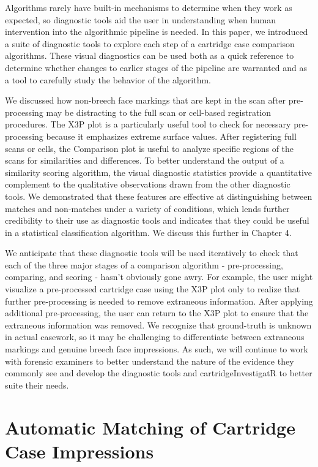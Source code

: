\documentclass[11pt,]{isuthesis}
\begin{document}
Algorithms rarely have built-in mechanisms to determine when they work as expected, so diagnostic tools aid the user in understanding when human intervention into the algorithmic pipeline is needed.
In this paper, we introduced a suite of diagnostic tools to explore each step of a cartridge case comparison algorithms.
These visual diagnostics can be used both as a quick reference to determine whether changes to earlier stages of the pipeline are warranted and as a tool to carefully study the behavior of the algorithm.

We discussed how non-breech face markings that are kept in the scan after pre-processing may be distracting to the full scan or cell-based registration procedures.
The X3P plot is a particularly useful tool to check for necessary pre-processing because it emphasizes extreme surface values.
After registering full scans or cells, the Comparison plot is useful to analyze specific regions of the scans for similarities and differences.
To better understand the output of a similarity scoring algorithm, the visual diagnostic statistics provide a quantitative complement to the qualitative observations drawn from the other diagnostic tools.
We demonstrated that these features are effective at distinguishing between matches and non-matches under a variety of conditions, which lends further credibility to their use as diagnostic tools and indicates that they could be useful in a statistical classification algorithm.
We discuss this further in Chapter 4.

We anticipate that these diagnostic tools will be used iteratively to check that each of the three major stages of a comparison algorithm - pre-processing, comparing, and scoring - hasn't obviously gone awry.
For example, the user might visualize a pre-processed cartridge case using the X3P plot only to realize that further pre-processing is needed to remove extraneous information.
After applying additional pre-processing, the user can return to the X3P plot to ensure that the extraneous information was removed.
We recognize that ground-truth is unknown in actual casework, so it may be challenging to differentiate between extraneous markings and genuine breech face impressions.
As such, we will continue to work with forensic examiners to better understand the nature of the evidence they commonly see and develop the diagnostic tools and cartridgeInvestigatR to better suite their needs.

\hypertarget{automatic-matching-of-cartridge-case-impressions}{%
\chapter{Automatic Matching of Cartridge Case Impressions}\label{automatic-matching-of-cartridge-case-impressions}}
\end{document}
